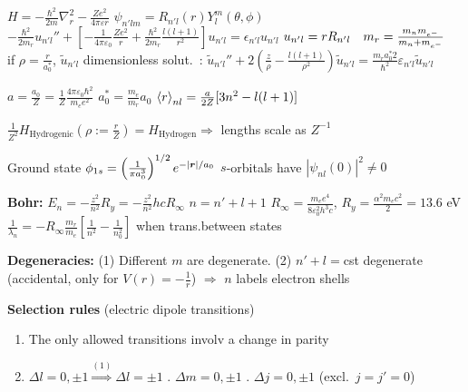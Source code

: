 
\begin{squishlist}
    \item $H = - \frac{\hbar^2}{2m}\nabla^2_r - \frac{Z e^2}{4 \pi \varepsilon r} $ \qquad 
    $\psi_{n'lm} = R_{n'l}(r) Y_l^m(\theta, \phi)$ \\
    $ - \frac{\hbar^2}{2m_r}u_{n'l}'' + \left[-\frac{1}{4\pi \varepsilon_0}\frac{Ze^2}{r} + \frac{\hbar^2}{2m_r}\frac{l(l+1)}{r^2}\right] u_{n'l} = \epsilon_{n'l}u_{n'l}$ \quad $u_{n'l} = r R_{n'l} \quad m_r = \frac{m_nm_{e^-}}{m_n + m_{e^-}}$ \\
    if $\rho = \frac{r}{a_0^*}$, $\tilde{u}_{n'l}$ dimensionless solut.\ : $\tilde{u}_{n'l}'' + 2(\frac{z}{\rho} - \frac{l(l+1)}{\rho^2})\tilde{u}_{n'l} = \frac{m_r a_0^*2}{\hbar^2} \varepsilon_{n'l} \tilde{u}_{n'l}$
    \item $ a = \frac{a_0}{Z} = \frac{1}{Z} \frac{4\pi \varepsilon_0 \hbar^2}{m_e e^2}$ \quad $a_0^* = \frac{m_e}{m_r}a_0$
    \squishsep $\braket{r}_{nl} = \frac{a}{2Z} [3n^2 - l(l+1)]$
    \item $\frac{1}{Z^2}H_{\text{Hydrogenic}}\left(\rho:=\frac{r}{Z}\right) = H_{\text{Hydrogen}} \Longrightarrow$ lengths scale as $Z^{-1}$
    \item Ground state $\phi_{1s} = \left(\frac{1}{\pi a_0^3}\right)^{1/2} e^{-|\bm{r}|/a_0} $
    \squishsep $s$-orbitals have $\left|\psi_{nl}(0)\right|^2 \neq 0$
    \item \textbf{Bohr:} $E_n = - \frac{z^2}{n^2} R_y = - \frac{z^2}{n^2}h c R_{\infty}$ \quad $n = n' + l + 1$ \quad $R_{\infty} = \frac{m_e e^4}{8 \varepsilon_0^2 h^3 c}$, $R_y = \frac{\alpha^2 m_e c^2 }{2} = 13.6$ eV\\
     $\frac{1}{\lambda_n} = - R_{\infty} \frac{m_r}{m_e} \left[ \frac{1}{n^2} - \frac{1}{n_0^2}\right]$ when trans.between states

    \item \textbf{Degeneracies:} (1) Different $m$ are degenerate. (2) $n'+l =$cst degenerate (accidental, only for $V(r) = -\frac{1}{r}$) $\Longrightarrow$ $n$ labels electron shells
    

    \item \textbf{Selection rules} (electric dipole transitions)
        \begin{enumerate}
            \item The only allowed transitions involv a change in parity
            \item $\Delta l = 0, \pm1 \overset{(1)}{\Longrightarrow} \Delta l = \pm 1$ . $\Delta m = 0, \pm 1$ . $\Delta j = 0,\pm 1$ (excl.\ $j=j'=0$)
        \end{enumerate}
    

\end{squishlist}
